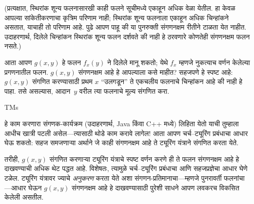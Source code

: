 \documentclass[../../../include/open-logic-section]{subfiles}
\begin{document}
(प्रत्यक्षात, स्थिरांक शून्य फलनासारखी काही फलने सूचीमध्ये एकाहून अधिक वेळा
येतील. हा केवळ आपल्या सांकेतीकरणाचा कृत्रिम परिणाम नाही; स्थिरांक शून्य
फलनाला एकाहून अधिक चिन्हांकने असतात, याचाही तो परिणाम आहे. पुढे आपण पाहू की
या पुनरुक्ती संगणनक्षम रीतीने टाळता येत नाहीत. उदाहरणार्थ, दिलेले चिन्हांकन
स्थिरांक शून्य फलन दर्शवते की नाही हे ठरवणारे कोणतेही संगणनक्षम फलन नसते.)

आता आपण $g(x,y)$ हे फलन $f_x(y)$ ने दिलेले मानू शकतो; येथे $f_x$ म्हणजे
नुकत्याच वर्णन केलेल्या प्रगणनातील फलन. $g(x,y)$ संगणनक्षम आहे हे आपल्याला
कसे माहीत? सहजपणे हे स्पष्ट आहे: $g(x,y)$ संगणित करण्यासाठी प्रथम $x$
``उलगडून'' ते एकचलीय फलनाचे चिन्हांकन आहे की नाही हे पाहा. तसे असल्यास,
आदान~$y$ वरील त्या फलनाचे मूल्य संगणित करा.

\begin{tagblock}{TMs}
\begin{digress}
हे काम करणारा संगणक-कार्यक्रम (उदाहरणार्थ, Java किंवा C++ मध्ये) लिहिता येतो
याची तुम्हाला आधीच खात्री पटली असेल---त्यासाठी थोडे काम करावे लागेल! आता
आपण चर्च--ट्यूरिंग प्रबंधाचा आधार घेऊ शकतो: सहज समजणाऱ्या अर्थाने जे काही
संगणनक्षम आहे ते ट्यूरिंग यंत्राने संगणित करता येते.

तरीही, $g(x,y)$ संगणित करणाऱ्या ट्यूरिंग यंत्राचे स्पष्ट वर्णन करणे ही ते
फलन संगणनक्षम आहे हे दाखवण्याची अधिक थेट पद्धत आहे. विशेषतः, त्यामुळे
चर्च--ट्यूरिंग प्रबंधाचा आणि सहजप्रज्ञेचा आधार घेणे टळेल. ट्यूरिंग यंत्रावर
ज्याचे \emph{अनुकरण} करता येते अशा संगणन-प्रतिमानाचा---म्हणजे पुनरावर्ती
फलनांचा---आधार घेऊन $g(x,y)$ संगणनक्षम आहे हे दाखवण्यासाठी पुरेशी साधने आपण
लवकरच विकसित केलेली असतील.
\end{digress}
\end{tagblock}
\end{document}
